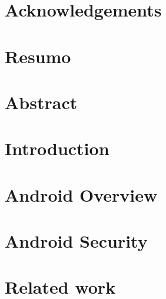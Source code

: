 \documentclass[a4paper,12pt,twoside]{book}
\begin{document}
\sloppy
\frontmatter

%
%




 \setcounter{page}{1}

\chapter*{Acknowledgements}


\chapter*{Resumo}


\chapter*{Abstract}


\cleardoublepage
{}\setcounter{page}{1}
\tableofcontents

\listoffigures
{}

\listoftables
{}

\printglossary[type=\acronymtype]



\mainmatter
\chapter{Introduction}
\label{chap:introduction}


\chapter{Android Overview}
\label{chap:android_overview}


\chapter{Android Security}
\label{chap:android_security}


\chapter{Related work}
\label{chap:background}

\end{document}
